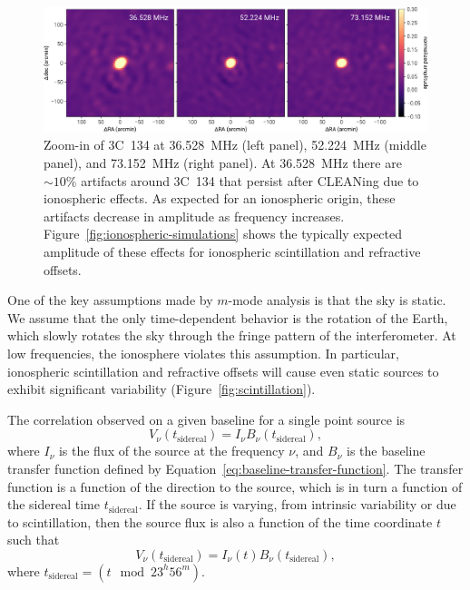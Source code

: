 \begin{bibunit}
\begin{figure}[t]
    \centering
    \includegraphics[width=\textwidth]{figures/chapter3/3C134}
    \caption{
        Zoom-in of 3C~134 at 36.528~MHz (left panel), 52.224~MHz (middle panel), and 73.152~MHz
        (right panel). At 36.528~MHz there are $\sim10\%$ artifacts around 3C~134 that persist after
        CLEANing due to ionospheric effects. As expected for an ionospheric origin, these artifacts
        decrease in amplitude as frequency increases. Figure~\ref{fig:ionospheric-simulations} shows
        the typically expected amplitude of these effects for ionospheric scintillation and
        refractive offsets.
    }
    \label{fig:3C134}
\end{figure}

One of the key assumptions made by $m$-mode analysis is that the sky is static.  We assume that the
only time-dependent behavior is the rotation of the Earth, which slowly rotates the sky through the
fringe pattern of the interferometer. At low frequencies, the ionosphere violates this assumption.
In particular, ionospheric scintillation and refractive offsets will cause even static sources to
exhibit significant variability (Figure~\ref{fig:scintillation}).

The correlation observed on a given baseline for a single point source is
\begin{equation}
    V_\nu(t_{\textrm{sidereal}}) = I_\nu B_\nu(t_{\textrm{sidereal}}),
\end{equation}
where $I_\nu$ is the flux of the source at the frequency $\nu$, and $B_\nu$ is the baseline transfer
function defined by Equation~\ref{eq:baseline-transfer-function}. The transfer function is a
function of the direction to the source, which is in turn a function of the sidereal time
$t_{\textrm{sidereal}}$. If the source is varying, from intrinsic variability or due to
scintillation, then the source flux is also a function of the time coordinate $t$ such that
\begin{equation}
    V_\nu(t_{\textrm{sidereal}}) = I_\nu(t) B_\nu(t_{\textrm{sidereal}}),
\end{equation}
where $t_{\textrm{sidereal}} = (t \mod 23^h56^m)$.


\end{bibunit}
